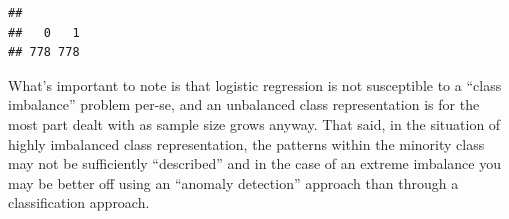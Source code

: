 \documentclass[
]{article}
\newenvironment{Shaded}{\begin{snugshade}}{\end{snugshade}}
\newcommand{\FunctionTok}[1]{\textcolor[rgb]{0.00,0.00,0.00}{#1}}
\newcommand{\NormalTok}[1]{#1}
\newcommand{\SpecialCharTok}[1]{\textcolor[rgb]{0.00,0.00,0.00}{#1}}
\begin{document}
\begin{Shaded}
\end{Shaded}

\begin{verbatim}
## 
##   0   1 
## 778 778
\end{verbatim}

What's important to note is that logistic regression is not susceptible
to a ``class imbalance'' problem per-se, and an unbalanced class
representation is for the most part dealt with as sample size grows
anyway. That said, in the situation of highly imbalanced class
representation, the patterns within the minority class may not be
sufficiently ``described'' and in the case of an extreme imbalance you
may be better off using an ``anomaly detection'' approach than through a
classification approach.
\end{document}
